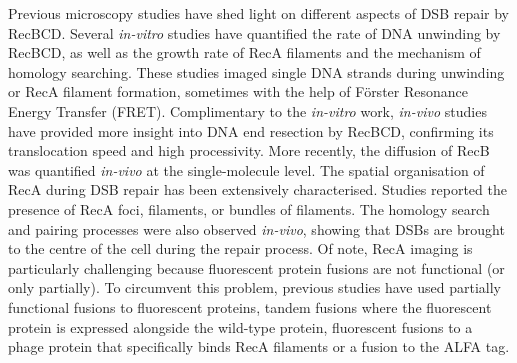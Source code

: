 Previous microscopy studies have shed light on different aspects of DSB repair by RecBCD. Several \emph{in-vitro} studies have quantified the rate of DNA unwinding by RecBCD\cite{Spies2003,Liu2013}, as well as the growth rate of RecA filaments\cite{Joo2006,Galletto2006,Handa2009} and the mechanism of homology searching\cite{Forget2012,Ragunathan2012}. These studies imaged single DNA strands during unwinding or RecA filament formation, sometimes with the help of Förster Resonance Energy Transfer (FRET)\cite{Joo2006,Ragunathan2012}. Complimentary to the \emph{in-vitro} work, \emph{in-vivo} studies have provided more insight into DNA end resection by RecBCD\cite{Wiktor2018}, confirming its translocation speed and high processivity. More recently, the diffusion of RecB was quantified \emph{in-vivo} at the single-molecule level\cite{Lepore2023}. The spatial organisation of RecA during DSB repair has been extensively characterised. Studies reported the presence of RecA foci\cite{Renzette2005,Renzette2007,Centore2007,Amarh2018}, filaments\cite{Kidane2005}, or bundles of filaments\cite{Lesterlin2013,Ghodke2019}. The homology search and pairing processes were also observed \emph{in-vivo}, showing that DSBs are brought to the centre of the cell during the repair process\cite{Badrinarayanan2015,Wiktor2021}. Of note, RecA imaging is particularly challenging because fluorescent protein fusions are not functional (or only partially). To circumvent this problem, previous studies have used partially functional fusions to fluorescent proteins\cite{Kidane2005,Renzette2005,Renzette2007,Centore2007,Lesterlin2013,Klimova2020}, tandem fusions where the fluorescent protein is expressed alongside the wild-type protein\cite{Amarh2018,Wiktor2021}, fluorescent fusions to a phage protein that specifically binds RecA filaments\cite{Ghodke2019} or a fusion to the ALFA tag\cite{Wiktor2021}.

